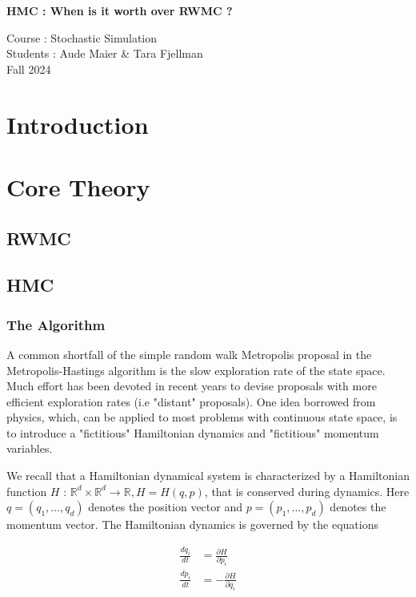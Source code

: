 \documentclass[a4paper, 12pt,oneside]{article}
\begin{document}
 
	\begin{center}
	    \Large
	    \textbf{HMC : When is it worth over RWMC ?} 
	    \vspace{0.4cm}
	    \large

		Course : Stochastic Simulation \\
	    Students : Aude Maier \& Tara Fjellman \\
	    \small{Fall 2024}
	\end{center}

	\section{Introduction}
	\section{Core Theory}
		\subsection{RWMC}
		\subsection{HMC}
			\subsubsection{The Algorithm}
			A common shortfall of the simple random walk Metropolis proposal in the Metropolis-Hastings algorithm is the slow exploration rate of the state space. Much effort has been devoted in recent years to devise proposals with more efficient exploration rates (i.e "distant" proposals). One idea borrowed from physics, which, can be applied to most problems with continuous state space, is to introduce a "fictitious" Hamiltonian dynamics and "fictitious" momentum variables.

			We recall that a Hamiltonian dynamical system is characterized by a Hamiltonian function $H$ : $\mathbb{R}^d \times \mathbb{R}^d \rightarrow \mathbb{R}, H=H(q, p)$, that is conserved during dynamics. Here $q=\left(q_1, \ldots, q_d\right)$ denotes the position vector and $p=\left(p_1, \ldots, p_d\right)$ denotes the momentum vector. The Hamiltonian dynamics is governed by the equations
			
			$$
			\begin{aligned}
			\frac{d q_i}{d t} & =\frac{\partial H}{\partial p_i} \\
			\frac{d p_i}{d t} & =-\frac{\partial H}{\partial q_i}
			\end{aligned}
			$$
			
\end{document}
